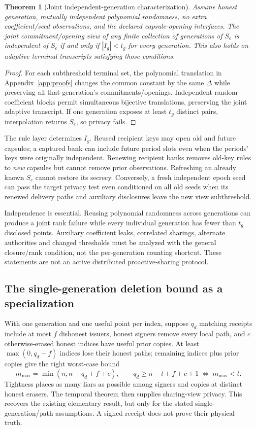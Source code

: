 \documentclass[pdflatex,sn-mathphys-num]{sn-jnl}
\theoremstyle{plain}
\newtheorem{theorem}{Theorem}
\theoremstyle{definition}
\begin{document}
\begin{theorem}[Joint independent-generation characterization]\label{thm:temporal}
Assume honest generation, mutually independent polynomial randomness, no extra coefficient/seed observations, and the declared capsule-opening interfaces. The joint commitment/opening view of any finite collection of generations of $S_e$ is independent of $S_e$ if and only if $|I_g|<t_g$ for every generation. This also holds on adaptive terminal transcripts satisfying those conditions.
\end{theorem}
\begin{proof}
For each subthreshold terminal set, the polynomial translation in Appendix~\ref{app:proofs} changes the common constant by the same $\Delta$ while preserving all that generation's commitments/openings. Independent random-coefficient blocks permit simultaneous bijective translations, preserving the joint adaptive transcript. If one generation exposes at least $t_g$ distinct pairs, interpolation returns $S_e$, so privacy fails.
\end{proof}

The rule layer determines $I_g$. Reused recipient keys may open old and future capsules; a captured bank can include future period slots even when the periods' keys were originally independent. Renewing recipient banks removes old-key rules to \emph{new} capsules but cannot remove prior observations. Refreshing an already known $S_e$ cannot restore its secrecy. Conversely, a fresh independent epoch seed can pass the target privacy test even conditioned on all old seeds when its renewed delivery paths and auxiliary disclosures leave the new view subthreshold.

Independence is essential. Reusing polynomial randomness across generations can produce a joint rank failure while every individual generation has fewer than $t_g$ disclosed points. Auxiliary coefficient leaks, correlated sharings, alternate authorities and changed thresholds must be analyzed with the general closure/rank condition, not the per-generation counting shortcut. These statements are not an active distributed proactive-sharing protocol.

\subsection{The single-generation deletion bound as a specialization}
With one generation and one useful point per index, suppose $q_d$ matching receipts include at most $f$ dishonest issuers, honest signers remove every local path, and $c$ otherwise-erased honest indices have useful prior copies. At least $\max(0,q_d-f)$ indices lose their honest paths; remaining indices plus prior copies give the tight worst-case bound
\begin{equation}\label{eq:deletion}
 m_{\max}=\min(n,n-q_d+f+c),\qquad
 q_d\ge n-t+f+c+1\ \Longleftrightarrow\ m_{\max}<t.
\end{equation}
Tightness places as many liars as possible among signers and copies at distinct honest erasers. The temporal theorem then supplies sharing-view privacy. This recovers the existing elementary result, but only for the stated single-generation/path assumptions. A signed receipt does not prove their physical truth.
\end{document}
